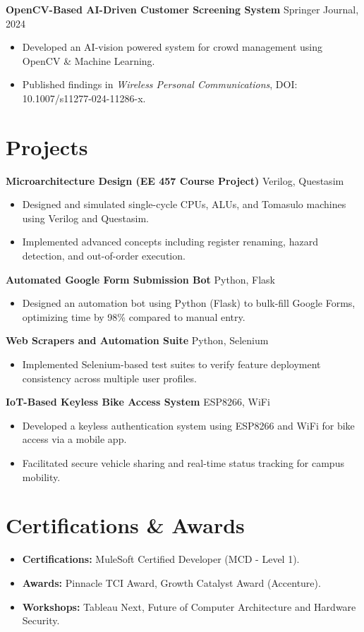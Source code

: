 \documentclass[letterpaper,10pt]{article}
\begin{document}
    \textbf{OpenCV-Based AI-Driven Customer Screening System} \hfill Springer Journal, 2024
    \begin{itemize}
        \item Developed an AI-vision powered system for crowd management using OpenCV \& Machine Learning.
        \item Published findings in \textit{Wireless Personal Communications}, DOI: 10.1007/s11277-024-11286-x.
    \end{itemize}

\section*{Projects}
\textbf{Microarchitecture Design (EE 457 Course Project)} \hfill Verilog, Questasim
\begin{itemize}
    \item Designed and simulated single-cycle CPUs, ALUs, and Tomasulo machines using Verilog and Questasim.
    \item Implemented advanced concepts including register renaming, hazard detection, and out-of-order execution.
\end{itemize}

\textbf{Automated Google Form Submission Bot} \hfill Python, Flask
\begin{itemize}
    \item Designed an automation bot using Python (Flask) to bulk-fill Google Forms, optimizing time by 98\% compared to manual entry.
\end{itemize}

\textbf{Web Scrapers and Automation Suite} \hfill Python, Selenium
\begin{itemize}
    \item Implemented Selenium-based test suites to verify feature deployment consistency across multiple user profiles.
\end{itemize}

\textbf{IoT-Based Keyless Bike Access System} \hfill ESP8266, WiFi
\begin{itemize}
    \item Developed a keyless authentication system using ESP8266 and WiFi for bike access via a mobile app.
    \item Facilitated secure vehicle sharing and real-time status tracking for campus mobility.
\end{itemize}

\section*{Certifications \& Awards}
\begin{itemize} \itemsep -2pt
    \item \textbf{Certifications:} MuleSoft Certified Developer (MCD - Level 1).
    \item \textbf{Awards:} Pinnacle TCI Award, Growth Catalyst Award (Accenture).
    \item \textbf{Workshops:} Tableau Next, Future of Computer Architecture and Hardware Security.
\end{itemize}
\end{document}
